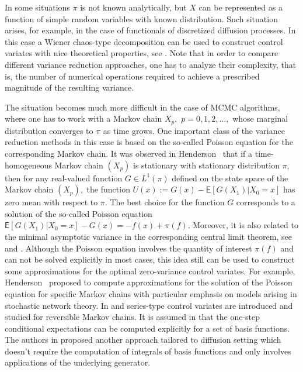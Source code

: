 \documentclass[bj]{imsart}
\begin{document}
In some situations \(\pi\) is not known analytically, but \(X\) can be represented as a function of  simple random variables with known distribution.
Such  situation arises, for example, in the case of functionals of  discretized diffusion processes. In this case a Wiener chaos-type decomposition can be used to construct control variates with nice theoretical properties, see \cite{belomestny2018stratified}.
Note that in order to compare different  variance reduction approaches, one has to analyze their complexity, that is, the number of numerical operations required to achieve a prescribed magnitude of the resulting variance.


The situation becomes much more difficult in the case of MCMC algorithms, where one  has to work with a
Markov chain \(X_p,\) \(p=0,1,2,\ldots,\) whose marginal distribution  converges  to \(\pi\) as time grows. One important class of the variance reduction methods in this case  is based on the so-called Poisson equation for the corresponding  Markov chain. It was observed in Henderson~\cite{henderson1997variance}  that if a time-homogeneous Markov chain \((X_p)\) is stationary with stationary distribution \(\pi,\) then for any real-valued function \(G \in L^1(\pi) \) defined on the state space of the Markov chain \((X_p),\)  the function \(U(x) := G(x)-\mathsf{E}[G(X_{1})|X_0 = x]\) has zero mean with respect to \(\pi\).  The best choice for the function \(G\) corresponds to a solution of the so-called Poisson equation  \(\mathsf{E}[G(X_{1})|X_0 = x]-G(x)=-f(x)+\pi(f)\).  Moreover, it is also related to the minimal asymptotic variance in the corresponding central limit theorem, see \cite{duncan2016variance} and \cite{mira2013zero}.   Although the Poisson equation involves the quantity of interest \(\pi(f)\)  and can not be  solved explicitly in most cases, this idea still can be used to construct some  approximations for the optimal zero-variance control variates. For example,  Henderson~\cite{henderson1997variance} proposed to compute approximations for the solution of the Poisson equation for specific Markov chains with particular emphasis on models arising in stochastic network theory. In \cite{dellaportas2012control} and \cite{brosse2018diffusion}  series-type control variates are introduced and studied for reversible Markov chains. It is assumed in \cite{dellaportas2012control}  that the one-step conditional expectations  can be computed explicitly  for a set of basis functions. The authors in \cite{brosse2018diffusion} proposed another approach tailored to diffusion setting which doesn't require the computation of integrals of basis functions and only involves  applications of the underlying generator.
\end{document}
